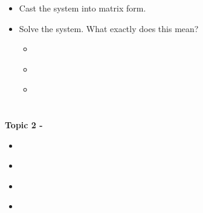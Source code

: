\documentclass[fleqn]{beamer} %
\newcommand{\sectionIItitle}{}
\newcommand{\sectionIsubsectionIIItitle}{}
\newcommand{\sectionIsubsectionIVtitle}{}
\newcommand{\sectionIIsubsectionItitle}{}
\newcommand{\sectionIIsubsectionIItitle}{}
\newcommand{\sectionIIsubsectionIIItitle}{}
\newcommand{\sectionIIsubsectionIVtitle}{}
\begin{document}
			\begin{frame} 
				\frametitle{\sectionIsubsectionIIItitle}
				\bigskip
	
				\begin{itemize}
		
					\item Cast the system into matrix form. \vspace{10mm}
			
					\item Solve the system. What exactly does this mean?\\
					\begin{itemize}
						\item \hspace{10mm} \\
						\item \hspace{10mm} \\
						\item \hspace{10mm} \\
					\end{itemize}
		
				\end{itemize}
			
				\btVFill
			\end{frame}	



		\subsection{\sectionIsubsectionIVtitle}\label{sectionIsubsectionIV}	

			\begin{frame}
				\frametitle{\sectionIsubsectionIVtitle}
				\bigskip


				\btVFill
			\end{frame}
	
	\section{\sectionIItitle}\label{sectionII}

		\begin{frame}
			\large \textbf{Topic 2 - \sectionIItitle} \vspace{3mm}\\

			\begin{itemize}
				\item \hyperlink{sectionIIsubsectionI}{\sectionIIsubsectionItitle} \vspc %
				\item \hyperlink{sectionIIsubsectionII}{\sectionIIsubsectionIItitle} \vspc %
				\item \hyperlink{sectionIIsubsectionIII}{\sectionIIsubsectionIIItitle} \vspc %
				\item \hyperlink{sectionIIsubsectionIV}{\sectionIIsubsectionIVtitle} \vspc %
			\end{itemize}

		\end{frame}
\end{document}
